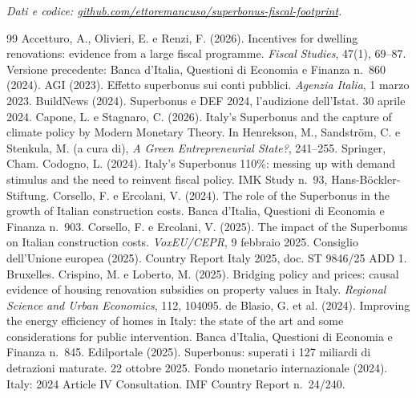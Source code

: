 \documentclass[11pt,a4paper]{article}
\begin{document}
\medskip
\textit{Dati e codice: \href{https://github.com/ettoremancuso/superbonus-fiscal-footprint}{github.com/ettoremancuso/superbonus-fiscal-footprint}.}

\renewcommand{\refname}{Riferimenti bibliografici}
\begin{thebibliography}{99}\small\setlength{\itemsep}{2pt}
 Accetturo, A., Olivieri, E. e Renzi, F. (2026). Incentives for dwelling renovations: evidence from a large fiscal programme. \textit{Fiscal Studies}, 47(1), 69--87. Versione precedente: Banca d'Italia, Questioni di Economia e Finanza n.~860 (2024).
 AGI (2023). Effetto superbonus sui conti pubblici. \textit{Agenzia Italia}, 1 marzo 2023.
 BuildNews (2024). Superbonus e DEF 2024, l'audizione dell'Istat. 30 aprile 2024.
 Capone, L. e Stagnaro, C. (2026). Italy's Superbonus and the capture of climate policy by Modern Monetary Theory. In Henrekson, M., Sandström, C. e Stenkula, M. (a cura di), \textit{A Green Entrepreneurial State?}, 241--255. Springer, Cham.
 Codogno, L. (2024). Italy's Superbonus 110\%: messing up with demand stimulus and the need to reinvent fiscal policy. IMK Study n.~93, Hans-Böckler-Stiftung.
 Corsello, F. e Ercolani, V. (2024). The role of the Superbonus in the growth of Italian construction costs. Banca d'Italia, Questioni di Economia e Finanza n.~903.
 Corsello, F. e Ercolani, V. (2025). The impact of the Superbonus on Italian construction costs. \textit{VoxEU/CEPR}, 9 febbraio 2025.
 Consiglio dell'Unione europea (2025). Country Report Italy 2025, doc. ST 9846/25 ADD 1. Bruxelles.
 Crispino, M. e Loberto, M. (2025). Bridging policy and prices: causal evidence of housing renovation subsidies on property values in Italy. \textit{Regional Science and Urban Economics}, 112, 104095.
 de Blasio, G. et al. (2024). Improving the energy efficiency of homes in Italy: the state of the art and some considerations for public intervention. Banca d'Italia, Questioni di Economia e Finanza n.~845.
 Edilportale (2025). Superbonus: superati i 127 miliardi di detrazioni maturate. 22 ottobre 2025.
 Fondo monetario internazionale (2024). Italy: 2024 Article IV Consultation. IMF Country Report n.~24/240.

\end{thebibliography}
\end{document}
